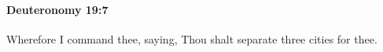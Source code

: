 
		\paragraph{Deuteronomy 19:7} %
			\label{DEUTERONOMY-19-7}

			Wherefore I command thee, saying, Thou shalt separate three cities for thee.


